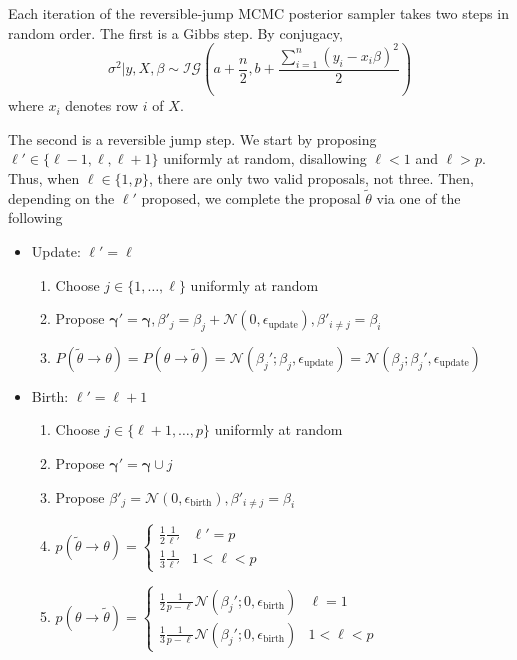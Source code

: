 Each iteration of the reversible-jump MCMC posterior sampler takes two steps in random order. The first is a Gibbs step. By conjugacy,
\begin{equation}
    \sigma^{2} | y, X, \beta \sim \mathcal{IG}\left(a + \frac{n}{2}, b + \frac{\sum_{i=1}^{n}(y_{i}-x_{i}\beta)^{2} }{2}\right)
\end{equation}
where $x_{i}$ denotes row $i$ of $X$.

The second is a reversible jump step. We start by proposing $\ell' \in \{\ell-1, \ell, \ell+1\}$ uniformly at random, disallowing $\ell<1$ and $\ell>p$. Thus, when $\ell \in \{1,p\}$, there are only two valid proposals, not three. Then, depending on the $\ell'$ proposed, we complete the proposal $\tilde{\theta}$ via one of the following
\begin{itemize}
    \item Update: $\ell' = \ell$
    \begin{enumerate}
        \item Choose $j \in \{1, \ldots, \ell\}$ uniformly at random
        \item Propose $\mathbf{\gamma}' = \mathbf{\gamma}, \beta'_{j} = \beta_{j} + \mathcal{N}(0, \epsilon_{\text{update}}), \beta'_{i \neq j} = \beta_{i}$
        \item $P(\tilde{\theta} \rightarrow \theta) = P(\theta \rightarrow \tilde{\theta})=\mathcal{N}(\beta_{j}'; \beta_{j},\epsilon_{\text{update}})=\mathcal{N}(\beta_{j}; \beta_{j}',\epsilon_{\text{update}})$
    \end{enumerate}
\end{itemize}

\begin{itemize}
    \item Birth: $\ell' = \ell+1$
    \begin{enumerate}
        \item Choose $j \in \{\ell+1, \ldots, p\}$ uniformly at random
        \item Propose $\mathbf{\gamma}' = \mathbf{\gamma} \cup j$
        \item Propose $\beta'_{j} = \mathcal{N}(0, \epsilon_{\text{birth}}), \beta'_{i \neq j} = \beta_{i}$
        \item $p(\tilde{\theta} \rightarrow \theta) = \begin{cases}\frac{1}{2}\frac{1}{\ell'} & \ell'=p \\ \frac{1}{3} \frac{1}{\ell'} & 1<\ell<p \end{cases} $
        \item $p(\theta \rightarrow \tilde{\theta}) = \begin{cases}\frac{1}{2}\frac{1}{p-\ell} \mathcal{N}(\beta_{j}'; 0,\epsilon_{\text{birth}}) & \ell=1 \\ \frac{1}{3} \frac{1}{p-\ell} \mathcal{N}(\beta_{j}'; 0,\epsilon_{\text{birth}}) & 1<\ell<p \end{cases} $
    \end{enumerate}
\end{itemize}

